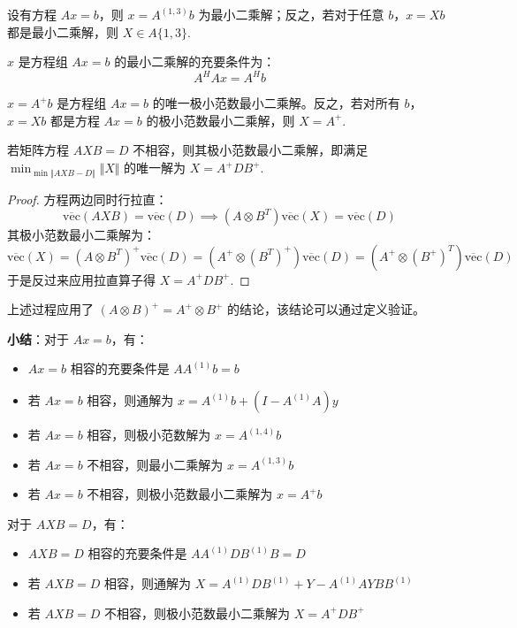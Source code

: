 \begin{theorem}[矛盾方程组的最小二乘解与 1,3-逆]
设有方程 $Ax=b$，则 $x=A^{(1,3)}b$ 为最小二乘解；反之，若对于任意 $b$，$x=Xb$ 都是最小二乘解，则 $X\in A\{1,3\}$.
\end{theorem}

\begin{theorem}[法方程]
$x$ 是方程组 $Ax=b$ 的最小二乘解的充要条件为：
\[
    A^HAx=A^Hb
\]
\end{theorem}

\begin{theorem}[矛盾方程组的极小范数最小二乘解与 $A^+$]
$x=A^+b$ 是方程组 $Ax=b$ 的唯一极小范数最小二乘解。反之，若对所有 $b$，$x=Xb$ 都是方程 $Ax=b$ 的极小范数最小二乘解，则 $X=A^+$.
\end{theorem}

\begin{theorem}
若矩阵方程 $AXB=D$ 不相容，则其极小范数最小二乘解，即满足 $\min_{\min \Vert AXB-D\Vert}\Vert X\Vert$ 的唯一解为 $X=A^+DB^+$.
\end{theorem}
\begin{proof}
方程两边同时行拉直：
\[
    \overline{\text{vec}}(AXB)=\overline{\text{vec}}(D)\implies (A\otimes B^T)\overline{\text{vec}}(X)=\overline{\text{vec}}(D)
\]
其极小范数最小二乘解为：
\[
    \overline{\text{vec}}(X)=(A\otimes B^T)^+\overline{\text{vec}}(D)=(A^+\otimes (B^T)^+)\overline{\text{vec}}(D)=(A^+\otimes (B^+)^T)\overline{\text{vec}}(D)
\]
于是反过来应用拉直算子得 $X=A^+DB^+$.
\end{proof}

\begin{com}
上述过程应用了 $(A\otimes B)^+=A^+\otimes B^+$ 的结论，该结论可以通过定义验证。
\end{com}


\vskip 6pt \noindent\textbf{小结}：对于 $Ax=b$，有：
\begin{itemize}
    \item $Ax=b$ 相容的充要条件是 $AA^{(1)}b=b$
    \item 若 $Ax=b$ 相容，则通解为 $x=A^{(1)}b+(I-A^{(1)}A)y$
    \item 若 $Ax=b$ 相容，则极小范数解为 $x=A^{(1,4)}b$
    \item 若 $Ax=b$ 不相容，则最小二乘解为 $x=A^{(1,3)}b$
    \item 若 $Ax=b$ 不相容，则极小范数最小二乘解为 $x=A^+b$
\end{itemize}

对于 $AXB=D$，有：
\begin{itemize}
    \item $AXB=D$ 相容的充要条件是 $AA^{(1)}DB^{(1)}B=D$
    \item 若 $AXB=D$ 相容，则通解为 $X=A^{(1)}DB^{(1)}+Y-A^{(1)}AYBB^{(1)}$
    \item 若 $AXB=D$ 不相容，则极小范数最小二乘解为 $X=A^+DB^+$
\end{itemize}

